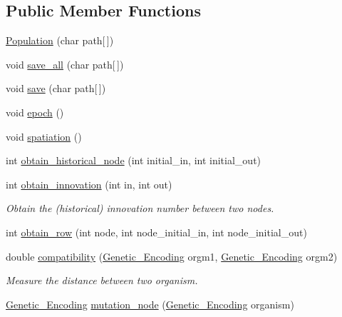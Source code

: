 \subsection*{Public Member Functions}
\begin{DoxyCompactItemize}
\item 
\hyperlink{class_a_n_n___u_s_m_1_1_population_a9c5a7b47b6fa36d3c53788029c33bd98}{Population} (char path\mbox{[}$\,$\mbox{]})
\item 
void \hyperlink{class_a_n_n___u_s_m_1_1_population_af15b09e6b9ca34cf5c7f15fe33d1c5bb}{save\-\_\-all} (char path\mbox{[}$\,$\mbox{]})
\item 
void \hyperlink{class_a_n_n___u_s_m_1_1_population_ad6a8d08fc4f4cbcc84405ddd7e40a453}{save} (char path\mbox{[}$\,$\mbox{]})
\item 
void \hyperlink{class_a_n_n___u_s_m_1_1_population_afcedc0302e1ce8e399f5ffb914ed216c}{epoch} ()
\item 
void \hyperlink{class_a_n_n___u_s_m_1_1_population_aa14d8cb45306aa8b9851791a6d547be6}{spatiation} ()
\item 
int \hyperlink{class_a_n_n___u_s_m_1_1_population_a037c144dd6c90391d312a1b38af6e057}{obtain\-\_\-historical\-\_\-node} (int initial\-\_\-in, int initial\-\_\-out)
\item 
int \hyperlink{class_a_n_n___u_s_m_1_1_population_a16090fdb0f1e89cc91568028777ac847}{obtain\-\_\-innovation} (int in, int out)
\begin{DoxyCompactList}\small\item\em Obtain the (historical) innovation number between two nodes. \end{DoxyCompactList}\item 
int \hyperlink{class_a_n_n___u_s_m_1_1_population_a84ab90f06fe08ed2b95638427086a331}{obtain\-\_\-row} (int node, int node\-\_\-initial\-\_\-in, int node\-\_\-initial\-\_\-out)
\item 
double \hyperlink{class_a_n_n___u_s_m_1_1_population_a92308bf99765cb66506c3ac4c1ee227c}{compatibility} (\hyperlink{class_a_n_n___u_s_m_1_1_genetic___encoding}{Genetic\-\_\-\-Encoding} orgm1, \hyperlink{class_a_n_n___u_s_m_1_1_genetic___encoding}{Genetic\-\_\-\-Encoding} orgm2)
\begin{DoxyCompactList}\small\item\em Measure the distance between two organism. \end{DoxyCompactList}\item 
\hyperlink{class_a_n_n___u_s_m_1_1_genetic___encoding}{Genetic\-\_\-\-Encoding} \hyperlink{class_a_n_n___u_s_m_1_1_population_a20ca394c0565450c1843333129057027}{mutation\-\_\-node} (\hyperlink{class_a_n_n___u_s_m_1_1_genetic___encoding}{Genetic\-\_\-\-Encoding} organism)

\end{DoxyCompactItemize}
